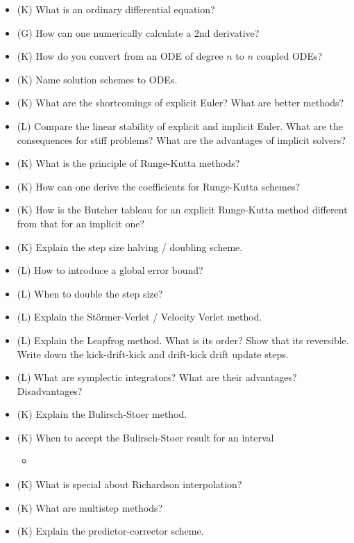 \begin{itemize}
    \item (K) What is an ordinary differential equation?
    \item (G) How can one numerically calculate a 2nd derivative?
    \item (K) How do you convert from an ODE of degree $n$ to $n$ coupled ODEs?
    \item (K) Name solution schemes to ODEs.
    \item (K) What are the shortcomings of explicit Euler? What are better methods?
    \item (L) Compare the linear stability of explicit and implicit Euler. What are the consequences for stiff problems? What are the advantages of implicit solvers?
    \item (K) What is the principle of Runge-Kutta methods?
    \item (K) How can one derive the coefficients for Runge-Kutta schemes?
    \item (K) How is the Butcher tableau for an explicit Runge-Kutta method different from that for an implicit one?
    \item (K) Explain the step size halving / doubling scheme.
    \item (L) How to introduce a global error bound?
    \item (L) When to double the step size?
    \item (L) Explain the Störmer-Verlet / Velocity Verlet method.
    \item (L) Explain the Leapfrog method. What is its order? Show that its reversible.
    Write down the kick-drift-kick and drift-kick drift update steps.
    \item (L) What are symplectic integrators? What are their advantages? Disadvantages?
    \item (K) Explain the Bulirsch-Stoer method.
    \item (K) When to accept the Bulirsch-Stoer result for an interval
    \begin{itemize}
        \item {}
    \end{itemize}
    \item (K) What is special about Richardson interpolation?
    \item (K) What are multistep methods?
    \item (K) Explain the predictor-corrector scheme.
\end{itemize}

